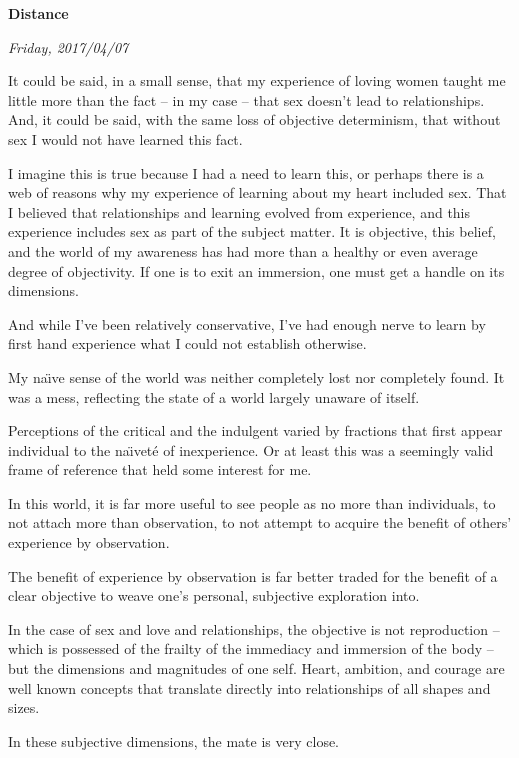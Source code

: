 

\centerline{\bf Distance}
\centerline{\it Friday, 2017/04/07}



\vfill
\break

It could be said, in a small sense, that my experience of loving women
taught me little more than the fact -- in my case -- that sex doesn't
lead to relationships.  And, it could be said, with the same loss of
objective determinism, that without sex I would not have learned this
fact.

I imagine this is true because I had a need to learn this, or perhaps
there is a web of reasons why my experience of learning about my heart
included sex.  That I believed that relationships and learning evolved
from experience, and this experience includes sex as part of the
subject matter.  It is objective, this belief, and the world of my
awareness has had more than a healthy or even average degree of
objectivity.  If one is to exit an immersion, one must get a handle on
its dimensions.

And while I've been relatively conservative, I've had enough nerve to
learn by first hand experience what I could not establish otherwise.

My na\"{\i}ve sense of the world was neither completely lost nor
completely found.  It was a mess, reflecting the state of a world
largely unaware of itself.

Perceptions of the critical and the indulgent varied by fractions that
first appear individual to the na\"{\i}vet\'{e} of inexperience.  Or
at least this was a seemingly valid frame of reference that held some
interest for me.

In this world, it is far more useful to see people as no more than
individuals, to not attach more than observation, to not attempt to
acquire the benefit of others' experience by observation.

The benefit of experience by observation is far better traded for the
benefit of a clear objective to weave one's personal, subjective
exploration into.

In the case of sex and love and relationships, the objective is not
reproduction -- which is possessed of the frailty of the immediacy and
immersion of the body -- but the dimensions and magnitudes of one
self.  Heart, ambition, and courage are well known concepts that
translate directly into relationships of all shapes and sizes.

In these subjective dimensions, the mate is very close.

